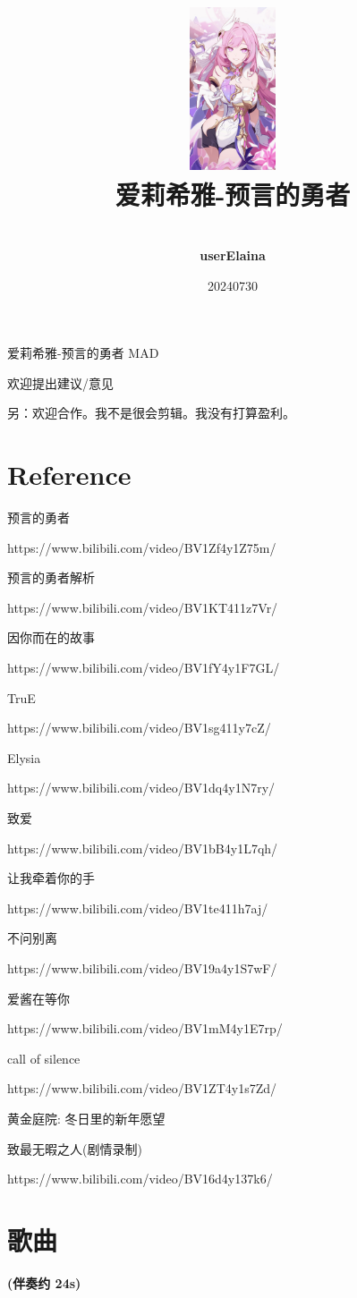 \documentclass[a4paper]{article}
\title{
    \vspace*{1.0in}
    \includegraphics[width=1in]{figures/100154449_p0.jpg} \\
    \vspace*{1in}
    \textbf{\Huge 爱莉希雅-预言的勇者}
    \vspace{0.5in}
}
\author{ \\
    \textbf{\huge userElaina} \\
    \vspace*{1in}
}
\date{\LARGE 20240730}
\begin{document}
\LARGE

\maketitle
\tableofcontents
\thispagestyle{empty}
\newpage

爱莉希雅-预言的勇者 MAD

欢迎提出建议/意见

另：欢迎合作。我不是很会剪辑。我没有打算盈利。

\section{Reference}

预言的勇者

https://www.bilibili.com/video/BV1Zf4y1Z75m/

预言的勇者解析

https://www.bilibili.com/video/BV1KT411z7Vr/

因你而在的故事

https://www.bilibili.com/video/BV1fY4y1F7GL/

TruE

https://www.bilibili.com/video/BV1sg411y7cZ/

Elysia

https://www.bilibili.com/video/BV1dq4y1N7ry/

致爱

https://www.bilibili.com/video/BV1bB4y1L7qh/

让我牵着你的手

https://www.bilibili.com/video/BV1te411h7aj/

不问别离

https://www.bilibili.com/video/BV19a4y1S7wF/

爱酱在等你

https://www.bilibili.com/video/BV1mM4y1E7rp/

call of silence

https://www.bilibili.com/video/BV1ZT4y1s7Zd/

黄金庭院: 冬日里的新年愿望

致最无暇之人(剧情录制)

https://www.bilibili.com/video/BV16d4y137k6/

\section{歌曲}

\textbf{(伴奏约 24s)}
\end{document}

